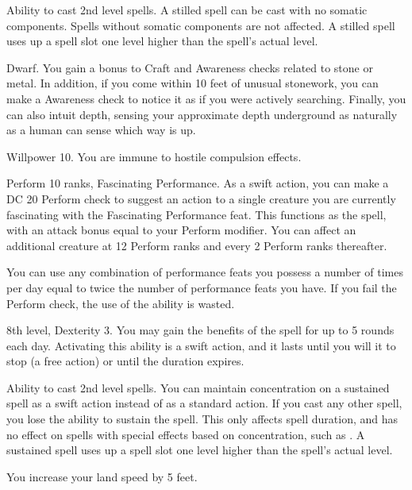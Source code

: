 \featpre Ability to cast 2nd level spells.
\featben A stilled spell can be cast with no somatic components.
Spells without somatic components are not affected.
A stilled spell uses up a spell slot one level higher than the spell's actual level.

\featpre Dwarf.
\featben You gain a  bonus to Craft and Awareness checks related to stone or metal.
In addition, if you come within 10 feet of unusual stonework, you can make a Awareness check to notice it as if you were actively searching.
Finally, you can also intuit depth, sensing your approximate depth underground as naturally as a human can sense which way is up.

\featpre Willpower 10.
\featben You are immune to hostile compulsion effects.

\featpres Perform 10 ranks, Fascinating Performance.
\featben As a swift action, you can make a DC 20 Perform check to suggest an action to a single creature you are currently fascinating with the Fascinating Performance feat.
This functions as the 
spell, with an attack bonus equal to your Perform modifier.
You can affect an additional creature at 12 Perform ranks and every 2 Perform ranks thereafter.

You can use any combination of performance feats you possess a number of times per day equal to twice the number of performance feats you have.
If you fail the Perform check, the use of the ability is wasted.

\featpres 8th level, Dexterity 3.
\featben You may gain the benefits of the 
spell for up to 5 rounds each day.
Activating this ability is a swift action, and it lasts until you will it to stop (a free action) or until the duration expires.

\featpre Ability to cast 2nd level spells.
\featben You can maintain concentration on a sustained spell as a swift action instead of as a standard action.
If you cast any other spell, you lose the ability to sustain the spell.
This only affects spell duration, and has no effect on spells with special effects based on concentration, such as .
A sustained spell uses up a spell slot one level higher than the spell's actual level.

\featben You increase your land speed by 5 feet.


